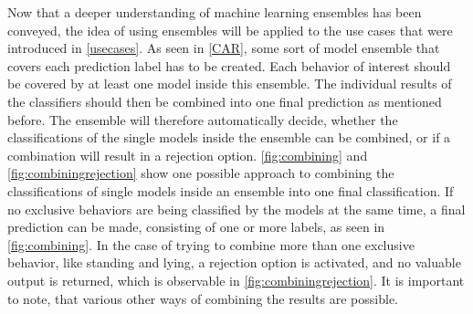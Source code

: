 Now that a deeper understanding of machine learning ensembles has been conveyed, the idea of using ensembles will be applied to the use cases that were introduced in \autoref{usecases}. As seen in \autoref{CAR}, some sort of model ensemble that covers each prediction label has to be created. Each behavior of interest should be covered by at least one model inside this ensemble. The individual results of the classifiers should then be combined into one final prediction as mentioned before. The ensemble will therefore automatically decide, whether the classifications of the single models inside the ensemble can be combined, or if a combination will result in a rejection option. \autoref{fig:combining} and \autoref{fig:combiningrejection} show one possible approach to combining the classifications of single models inside an ensemble into one final classification. If no exclusive behaviors are being classified by the models at the same time, a final prediction can be made, consisting of one or more labels, as seen in \autoref{fig:combining}. In the case of trying to combine more than one exclusive behavior, like standing and lying, a rejection option is activated, and no valuable output is returned, which is observable in \autoref{fig:combiningrejection}. It is important to note, that various other ways of combining the results are possible.



